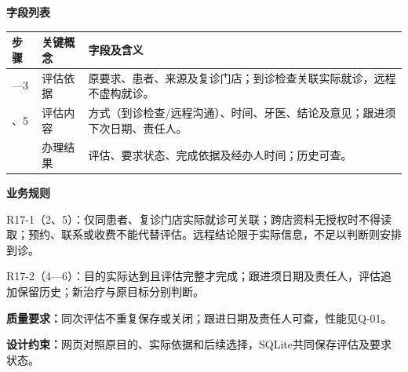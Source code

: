 \documentclass[UTF8,a4paper,zihao=-4,fontset=none]{ctexart}
\begin{document}
\noindent\textbf{字段列表}\par
{\setlength{\tabcolsep}{3pt}\renewcommand{\arraystretch}{1.04}
\noindent\begin{tabular}{@{}>{\raggedright\arraybackslash}p{1.2cm}>{\raggedright\arraybackslash}p{2.2cm}>{\raggedright\arraybackslash}p{12.3cm}@{}}
\toprule
步骤 & 关键概念 & 字段及含义 \\ \midrule
1—3 & 评估依据 & 原要求、患者、来源及复诊门店；到诊检查关联实际就诊，远程不虚构就诊。 \\
4、5 & 评估内容 & 方式（到诊检查/远程沟通）、时间、牙医、结论及意见；跟进须下次日期、责任人。 \\
6 & 办理结果 & 评估、要求状态、完成依据及经办人时间；历史可查。 \\
\bottomrule
\end{tabular}\par}
\smallskip
\noindent\textbf{业务规则}\par
\noindent R17-1（2、5）：仅同患者、复诊门店实际就诊可关联；跨店资料无授权时不得读取；预约、联系或收费不能代替评估。远程结论限于实际信息，不足以判断则安排到诊。\par
\noindent R17-2（4—6）：目的实际达到且评估完整才完成；跟进须日期及责任人，评估追加保留历史；新治疗与原目标分别判断。\par
\smallskip
\noindent\textbf{质量要求：}同次评估不重复保存或关闭；跟进日期及责任人可查，性能见Q-01。\par
\noindent\textbf{设计约束：}网页对照原目的、实际依据和后续选择，SQLite共同保存评估及要求状态。\par
\endgroup
\clearpage
\end{document}

